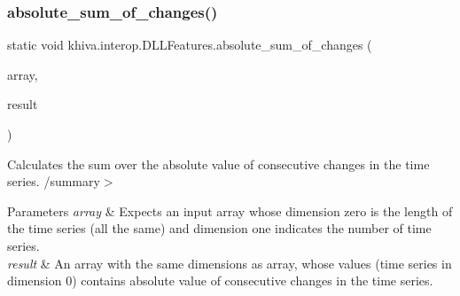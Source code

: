 \mbox{\label{classkhiva_1_1interop_1_1_d_l_l_features_a95e6cc3d240709e4304a0a35477c14e6}} 
\subsubsection{\texorpdfstring{absolute\+\_\+sum\+\_\+of\+\_\+changes()}{absolute\_sum\_of\_changes()}}
{\footnotesize\ttfamily static void khiva.\+interop.\+D\+L\+L\+Features.\+absolute\+\_\+sum\+\_\+of\+\_\+changes (\begin{DoxyParamCaption}\item[{\mbox{[}\+In\mbox{]} ref Int\+Ptr}]{array,  }\item[{\mbox{[}\+Out\mbox{]} out Int\+Ptr}]{result }\end{DoxyParamCaption})\hspace{0.3cm}{\ttfamily [static]}}



Calculates the sum over the absolute value of consecutive changes in the time series. /summary$>$ 
\begin{DoxyParams}{Parameters}
{\em array} & Expects an input array whose dimension zero is the length of the time series (all the same) and dimension one indicates the number of time series.\\
\hline
{\em result} & An array with the same dimensions as array, whose values (time series in dimension 0) contains absolute value of consecutive changes in the time series.\\
\hline
\end{DoxyParams}


\mbox{\label{classkhiva_1_1interop_1_1_d_l_l_features_a288ecd6e1fcbf929f58eec74bf654164}} 
